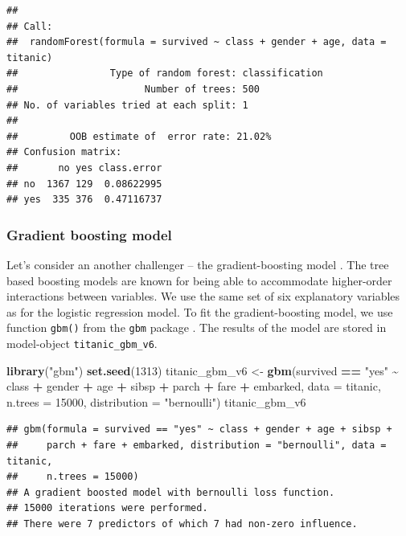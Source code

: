 \documentclass[12pt,]{krantz}
\newenvironment{Shaded}{\begin{snugshade}}{\end{snugshade}}
\newcommand{\DataTypeTok}[1]{\textcolor[rgb]{0.13,0.29,0.53}{#1}}
\newcommand{\DecValTok}[1]{\textcolor[rgb]{0.00,0.00,0.81}{#1}}
\newcommand{\KeywordTok}[1]{\textcolor[rgb]{0.13,0.29,0.53}{\textbf{#1}}}
\newcommand{\NormalTok}[1]{#1}
\newcommand{\OperatorTok}[1]{\textcolor[rgb]{0.81,0.36,0.00}{\textbf{#1}}}
\newcommand{\StringTok}[1]{\textcolor[rgb]{0.31,0.60,0.02}{#1}}
\begin{document}
\begin{verbatim}
## 
## Call:
##  randomForest(formula = survived ~ class + gender + age, data = titanic) 
##                Type of random forest: classification
##                      Number of trees: 500
## No. of variables tried at each split: 1
## 
##         OOB estimate of  error rate: 21.02%
## Confusion matrix:
##       no yes class.error
## no  1367 129  0.08622995
## yes  335 376  0.47116737
\end{verbatim}

\hypertarget{model-titanic-gbm}{%
\subsubsection{Gradient boosting model}\label{model-titanic-gbm}}

Let's consider an another challenger -- the gradient-boosting model \citep{Friedman00greedyfunction}. The tree based boosting models are known for being able to accommodate higher-order interactions between variables. We use the same set of six explanatory variables as for the logistic regression model. To fit the gradient-boosting model, we use function \texttt{gbm()} from the \texttt{gbm} package \citep{gbm}. The results of the model are stored in model-object \texttt{titanic\_gbm\_v6}.

\begin{Shaded}
\begin{Highlighting}[]
\KeywordTok{library}\NormalTok{(}\StringTok{"gbm"}\NormalTok{)}
\KeywordTok{set.seed}\NormalTok{(}\DecValTok{1313}\NormalTok{)}
\NormalTok{titanic\_gbm\_v6 \textless{}{-}}\StringTok{ }\KeywordTok{gbm}\NormalTok{(survived }\OperatorTok{==}\StringTok{ "yes"} \OperatorTok{\textasciitilde{}}\StringTok{ }\NormalTok{class }\OperatorTok{+}\StringTok{ }\NormalTok{gender }\OperatorTok{+}\StringTok{ }\NormalTok{age }\OperatorTok{+}\StringTok{ }\NormalTok{sibsp }\OperatorTok{+}\StringTok{ }\NormalTok{parch }\OperatorTok{+}\StringTok{ }\NormalTok{fare }\OperatorTok{+}\StringTok{ }\NormalTok{embarked, }
                      \DataTypeTok{data =}\NormalTok{ titanic, }\DataTypeTok{n.trees =} \DecValTok{15000}\NormalTok{, }\DataTypeTok{distribution =} \StringTok{"bernoulli"}\NormalTok{)}
\NormalTok{titanic\_gbm\_v6}
\end{Highlighting}
\end{Shaded}

\begin{verbatim}
## gbm(formula = survived == "yes" ~ class + gender + age + sibsp + 
##     parch + fare + embarked, distribution = "bernoulli", data = titanic, 
##     n.trees = 15000)
## A gradient boosted model with bernoulli loss function.
## 15000 iterations were performed.
## There were 7 predictors of which 7 had non-zero influence.
\end{verbatim}
\end{document}
